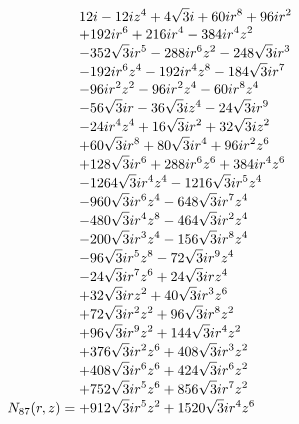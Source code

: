 \documentclass[11pt,a4paper]{article}
\begin{document}
\begin{equation}
N_{87}(r,z)=\shortstack[l]{$\displaystyle 12 i - 12 i z^{4} + 4 \sqrt{3} i + 60 i r^{8} + 96 i r^{2}$\\
$\displaystyle  + 192 i r^{6} + 216 i r^{4} - 384 i r^{4} z^{2}$\\
$\displaystyle  - 352 \sqrt{3} i r^{5} - 288 i r^{6} z^{2} - 248 \sqrt{3} i r^{3}$\\
$\displaystyle  - 192 i r^{6} z^{4} - 192 i r^{4} z^{8} - 184 \sqrt{3} i r^{7}$\\
$\displaystyle  - 96 i r^{2} z^{2} - 96 i r^{2} z^{4} - 60 i r^{8} z^{4}$\\
$\displaystyle  - 56 \sqrt{3} i r - 36 \sqrt{3} i z^{4} - 24 \sqrt{3} i r^{9}$\\
$\displaystyle  - 24 i r^{4} z^{4} + 16 \sqrt{3} i r^{2} + 32 \sqrt{3} i z^{2}$\\
$\displaystyle  + 60 \sqrt{3} i r^{8} + 80 \sqrt{3} i r^{4} + 96 i r^{2} z^{6}$\\
$\displaystyle  + 128 \sqrt{3} i r^{6} + 288 i r^{6} z^{6} + 384 i r^{4} z^{6}$\\
$\displaystyle  - 1264 \sqrt{3} i r^{4} z^{4} - 1216 \sqrt{3} i r^{5} z^{4}$\\
$\displaystyle  - 960 \sqrt{3} i r^{6} z^{4} - 648 \sqrt{3} i r^{7} z^{4}$\\
$\displaystyle  - 480 \sqrt{3} i r^{4} z^{8} - 464 \sqrt{3} i r^{2} z^{4}$\\
$\displaystyle  - 200 \sqrt{3} i r^{3} z^{4} - 156 \sqrt{3} i r^{8} z^{4}$\\
$\displaystyle  - 96 \sqrt{3} i r^{5} z^{8} - 72 \sqrt{3} i r^{9} z^{4}$\\
$\displaystyle  - 24 \sqrt{3} i r^{7} z^{6} + 24 \sqrt{3} i r z^{4}$\\
$\displaystyle  + 32 \sqrt{3} i r z^{2} + 40 \sqrt{3} i r^{3} z^{6}$\\
$\displaystyle  + 72 \sqrt{3} i r^{2} z^{2} + 96 \sqrt{3} i r^{8} z^{2}$\\
$\displaystyle  + 96 \sqrt{3} i r^{9} z^{2} + 144 \sqrt{3} i r^{4} z^{2}$\\
$\displaystyle  + 376 \sqrt{3} i r^{2} z^{6} + 408 \sqrt{3} i r^{3} z^{2}$\\
$\displaystyle  + 408 \sqrt{3} i r^{6} z^{6} + 424 \sqrt{3} i r^{6} z^{2}$\\
$\displaystyle  + 752 \sqrt{3} i r^{5} z^{6} + 856 \sqrt{3} i r^{7} z^{2}$\\
$\displaystyle  + 912 \sqrt{3} i r^{5} z^{2} + 1520 \sqrt{3} i r^{4} z^{6}$}
\label{eq:cat-numerator-87}
\end{equation}
\end{document}
